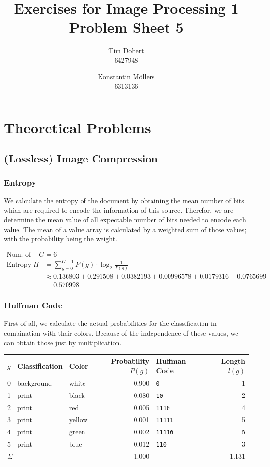 \documentclass[a4paper,12pt]{article}
\title{\textbf{Exercises for Image Processing 1}\\Problem Sheet 5}
\author{Tim Dobert\\6427948 \and Konstantin M\"ollers\\6313136}
\begin{document}
	\maketitle	
	
	\section{Theoretical Problems}
	\subsection{(Lossless) Image Compression}
	
	\subsubsection{Entropy}
	
	We calculate the entropy of the document by obtaining the mean number of bits which are required to encode the information of this source. Therefor, we are determine the mean value of all expectable number of bits needed to encode each value. The mean of a value array is calculated by a weighted sum of those values; with the probability being the weight.
	
	\begin{align*}
	\text{Num. of values }G	&= 6 \\
	\text{Entropy } H 	&= \sum\limits_{g = 0}^{G - 1} P(g) \cdot \log_2 \frac{1}{P(g)} 	\\
		&\approx 0.136803+ 0.291508+ 0.0382193+ 0.00996578+ 0.0179316+ 0.0765699\\
		&= 0.570998
	\end{align*}
	
	\subsubsection{Huffman Code}
	
	First of all, we calculate the actual probabilities for the classification in combination with their colors. Because of the independence of these values, we can obtain those just by multiplication.
	
	\begin{table}[h!]
		\centering
		\begin{tabular}{l|l|l|r|l|r}
			$g$ & \textbf{Classification} & \textbf{Color} & \textbf{Probability} $P(g)$ & \textbf{Huffman Code} & \textbf{Length} $l(g)$ \\\hline
			0 & background & white & 0.900 & \texttt{0} & 1 \\
			1 & print & black & 0.080 & \texttt{10} & 2 \\
			2 & print & red & 0.005 & \texttt{1110} & 4\\
			3 & print & yellow & 0.001 & \texttt{11111} & 5\\
			4 & print & green & 0.002 & \texttt{11110} & 5\\
			5 & print & blue & 0.012 & \texttt{110} & 3\\\hline
			\multicolumn{3}{l|}{$\Sigma$} & 1.000 & \multicolumn{2}{r}{1.131}
		\end{tabular}
	\end{table}
	
\end{document}
